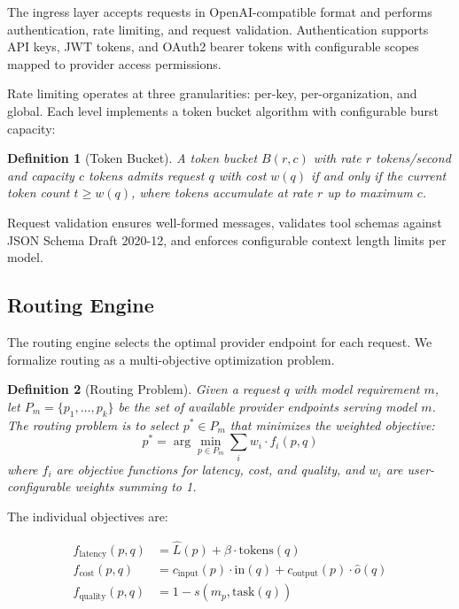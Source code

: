 \documentclass[11pt,twocolumn]{article}
\newtheorem{definition}{Definition}
\begin{document}
The ingress layer accepts requests in OpenAI-compatible format and performs authentication, rate limiting, and request validation. Authentication supports API keys, JWT tokens, and OAuth2 bearer tokens with configurable scopes mapped to provider access permissions.

Rate limiting operates at three granularities: per-key, per-organization, and global. Each level implements a token bucket algorithm with configurable burst capacity:

\begin{definition}[Token Bucket]
A token bucket $B(r, c)$ with rate $r$ tokens/second and capacity $c$ tokens admits request $q$ with cost $w(q)$ if and only if the current token count $t \geq w(q)$, where tokens accumulate at rate $r$ up to maximum $c$.
\end{definition}

Request validation ensures well-formed messages, validates tool schemas against JSON Schema Draft 2020-12, and enforces configurable context length limits per model.

\subsection{Routing Engine}
\label{sec:routing}

The routing engine selects the optimal provider endpoint for each request. We formalize routing as a multi-objective optimization problem.

\begin{definition}[Routing Problem]
Given a request $q$ with model requirement $m$, let $P_m = \{p_1, \ldots, p_k\}$ be the set of available provider endpoints serving model $m$. The routing problem is to select $p^* \in P_m$ that minimizes the weighted objective:
\begin{equation}
p^* = \arg\min_{p \in P_m} \sum_{i} w_i \cdot f_i(p, q)
\end{equation}
where $f_i$ are objective functions for latency, cost, and quality, and $w_i$ are user-configurable weights summing to 1.
\end{definition}

The individual objectives are:

\begin{align}
f_{\text{latency}}(p, q) &= \hat{L}(p) + \beta \cdot \text{tokens}(q) \label{eq:latency} \\
f_{\text{cost}}(p, q) &= c_{\text{input}}(p) \cdot \text{in}(q) + c_{\text{output}}(p) \cdot \hat{o}(q) \label{eq:cost} \\
f_{\text{quality}}(p, q) &= 1 - s(m_p, \text{task}(q)) \label{eq:quality}
\end{align}
\end{document}
